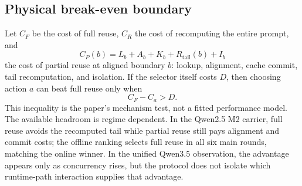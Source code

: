 \documentclass[conference]{IEEEtran}
\begin{document}
\subsection{Physical break-even boundary}
Let $C_F$ be the cost of full reuse, $C_R$ the cost of recomputing the entire
prompt, and
\begin{equation}
C_P(b)=L_b+A_b+K_b+R_{\mathrm{tail}}(b)+I_b
\end{equation}
the cost of partial reuse at aligned boundary $b$: lookup, alignment, cache
commit, tail recomputation, and isolation. If the selector itself costs $D$,
then choosing action $a$ can beat full reuse only when
\begin{equation}
C_F-C_a > D.
\end{equation}
This inequality is the paper's mechanism test, not a fitted performance model.
The available headroom is regime dependent. In the Qwen2.5 M2 carrier, full
reuse avoids the recomputed tail while partial reuse still pays alignment and
commit costs; the offline ranking selects full reuse in all six main rounds,
matching the online winner. In the unified Qwen3.5 observation, the advantage
appears only as concurrency rises, but the protocol does not isolate which
runtime-path interaction supplies that advantage.
\end{document}
